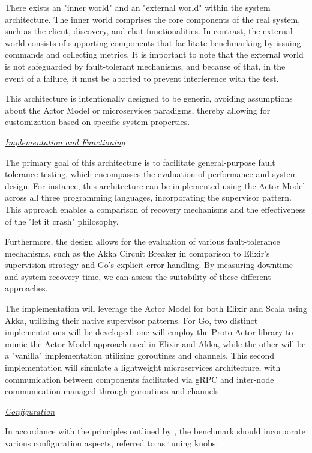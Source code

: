 There exists an "inner world" and an "external world" within the system architecture. The inner world comprises the core components of the real system, such as the client, discovery, and chat functionalities. In contrast, the external world consists of supporting components that facilitate benchmarking by issuing commands and collecting metrics. It is important to note that the external world is not safeguarded by fault-tolerant mechanisms, and because of that, in the event of a failure, it must be aborted to prevent interference with the test.

This architecture is intentionally designed to be generic, avoiding assumptions about the Actor Model or microservices paradigms, thereby allowing for customization based on specific system properties.

\textit{\underline{Implementation and Functioning}}

The primary goal of this architecture is to facilitate general-purpose fault tolerance testing, which encompasses the evaluation of performance and system design. For instance, this architecture can be implemented using the Actor Model across all three programming languages, incorporating the supervisor pattern. This approach enables a comparison of recovery mechanisms and the effectiveness of the "let it crash" philosophy.

Furthermore, the design allows for the evaluation of various fault-tolerance mechanisms, such as the Akka Circuit Breaker in comparison to Elixir’s supervision strategy and Go's explicit error handling. By measuring downtime and system recovery time, we can assess the suitability of these different approaches.

The implementation will leverage the Actor Model for both Elixir and Scala using Akka, utilizing their native supervisor patterns. For Go, two distinct implementations will be developed: one will employ the Proto-Actor library to mimic the Actor Model approach used in Elixir and Akka, while the other will be a "vanilla" implementation utilizing goroutines and channels. This second implementation will simulate a lightweight microservices architecture, with communication between components facilitated via \gls{gRPC} and inter-node communication managed through goroutines and channels.

\textit{\underline{Configuration}}

In accordance with the principles outlined by \textcite{Randtoul2022}, the benchmark should incorporate various configuration aspects, referred to as tuning knobs:

